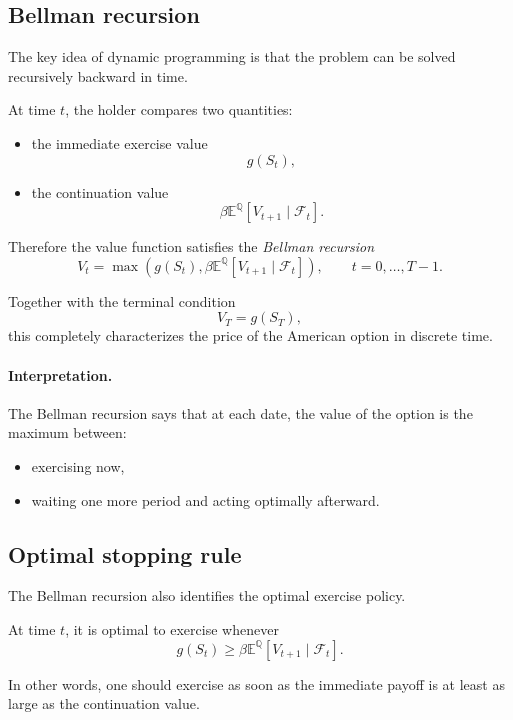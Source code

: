 \documentclass[11pt]{article}
\newcommand{\Qbb}{\mathbb{Q}}
\newcommand{\E}{\mathbb{E}}
\theoremstyle{definition}
\theoremstyle{plain}
\begin{document}
\subsection{Bellman recursion}

The key idea of dynamic programming is that the problem can be solved
recursively backward in time.

At time \(t\), the holder compares two quantities:
\begin{itemize}[leftmargin=1.4em]
    \item the immediate exercise value
    \[
    g(S_t),
    \]
    \item the continuation value
    \[
    \beta \E^{\Qbb}[V_{t+1}\mid\mathcal{F}_t].
    \]
\end{itemize}

Therefore the value function satisfies the \emph{Bellman recursion}
\[
\boxed{
V_t
=
\max\!\left(
g(S_t),
\beta \E^{\Qbb}[V_{t+1}\mid\mathcal{F}_t]
\right),
\qquad t=0,\dots,T-1.
}
\]

Together with the terminal condition
\[
V_T=g(S_T),
\]
this completely characterizes the price of the American option in
discrete time.

\paragraph{Interpretation.}
The Bellman recursion says that at each date, the value of the option is
the maximum between:
\begin{itemize}[leftmargin=1.4em]
    \item exercising now,
    \item waiting one more period and acting optimally afterward.
\end{itemize}

\subsection{Optimal stopping rule}

The Bellman recursion also identifies the optimal exercise policy.

At time \(t\), it is optimal to exercise whenever
\[
g(S_t)
\ge
\beta \E^{\Qbb}[V_{t+1}\mid\mathcal{F}_t].
\]

In other words, one should exercise as soon as the immediate payoff is
at least as large as the continuation value.
\end{document}
